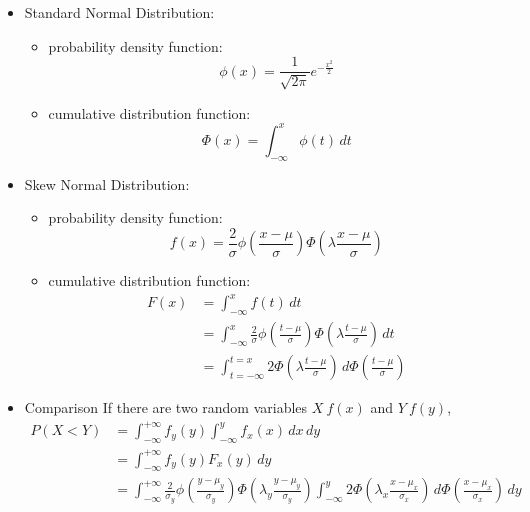 \documentclass{article}
\begin{document}
\begin{itemize}
    \item Standard Normal Distribution: 
    \begin{itemize}
        \item probability density function: $$\phi(x)=\frac{1}{\sqrt{2\pi}}e^{-\frac{x^2}{2}}$$
        \item cumulative distribution function: $$\Phi(x)=\int_{-\infty}^{x}\phi(t)\,dt$$
    \end{itemize}
    \item Skew Normal Distribution:
    \begin{itemize}
        \item probability density function: $$f(x)=\frac{2}{\sigma}\phi(\frac{x-\mu}{\sigma})\Phi(\lambda\frac{x-\mu}{\sigma})$$
        \item cumulative distribution function: 
        \begin{align*}
            F(x) &= \int_{-\infty}^{x}f(t)\,dt \\
                &= \int_{-\infty}^{x}\frac{2}{\sigma}\phi(\frac{t-\mu}{\sigma})\Phi(\lambda\frac{t-\mu}{\sigma})\,dt \\
                &= \int_{t=-\infty}^{t=x}2\Phi(\lambda\frac{t-\mu}{\sigma})\,d\Phi(\frac{t-\mu}{\sigma})
        \end{align*}
    \end{itemize}
    \item Comparison
    If there are two random variables $X~f(x)$ and $Y~f(y)$, 
    \begin{align*}
        P(X<Y) &= \int^{+\infty}_{-\infty}f_y(y)\int^{y}_{-\infty}f_x(x)\,dx\,dy \\
                &= \int^{+\infty}_{-\infty}f_y(y)F_x(y)\,dy \\
                &= \int^{+\infty}_{-\infty}\frac{2}{\sigma_y}\phi(\frac{y-\mu_y}{\sigma_y})\Phi(\lambda_y\frac{y-\mu_y}{\sigma_y})\int^{y}_{-\infty}2\Phi(\lambda_x\frac{x-\mu_x}{\sigma_x})\,d\Phi(\frac{x-\mu_x}{\sigma_x})\,dy 
    \end{align*}
\end{itemize}
\end{document}
